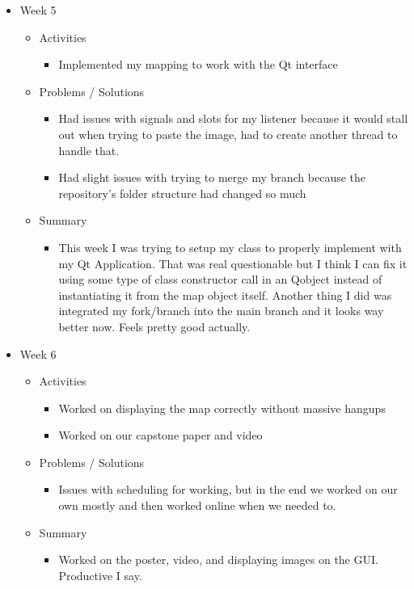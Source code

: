\begin{itemize}
\begin{itemize}
\begin{itemize}
\end{itemize}
\end{itemize}
\item{Week 5}
\begin{itemize}
\item Activities
\begin{itemize}
\item Implemented my mapping to work with the Qt interface
\end{itemize}
\item Problems / Solutions
\begin{itemize}
\item Had issues with signals and slots for my listener because it would stall out when trying to paste the image, had to create another thread to handle that.
\item Had slight issues with trying to merge my branch because the repository's folder structure had changed so much
\end{itemize}
\item Summary
\begin{itemize}
\item This week I was trying to setup my class to properly implement with my Qt Application. That was real questionable but I think I can fix it using some type of class constructor call in an Qobject instead of instantiating it from the map object itself. Another thing I did was integrated my fork/branch into the main branch and it looks way better now. Feels pretty good actually.
\end{itemize}
\end{itemize}
\item{Week 6}
\begin{itemize}
\item Activities
\begin{itemize}
\item Worked on displaying the map correctly without massive hangups
\item Worked on our capstone paper and video
\end{itemize}
\item Problems / Solutions
\begin{itemize}
\item Issues with scheduling for working, but in the end we worked on our own mostly and then worked online when we needed to.
\end{itemize}
\item Summary
\begin{itemize}
\item Worked on the poster, video, and displaying images on the GUI. Productive I say.

\end{itemize}
\end{itemize}
\end{itemize}
